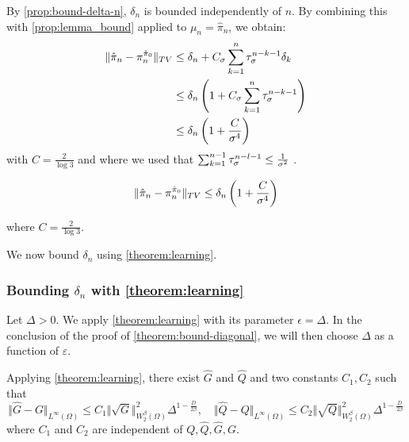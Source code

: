 By \cref{prop:bound-delta-n}, $\delta_n$ is bounded independently of $n$. By combining this with \cref{prop:lemma_bound} applied to $\mu_n = \hat \pi_n$, we obtain:
    \begin{align}
\Vert \hat \pi_n - \pi_n^{\hat \pi_0}\Vert_{TV} &\leq \delta_n + C_\sigma\sum_{k=1}^n \tau_\sigma^{n-k-1}\delta_k\\
&\leq \delta_n\left(1 + C_\sigma\sum_{k=1}^n \tau_\sigma^{n-k-1}\right)\\
&\leq \delta_n\left(1 + \frac{C}{\sigma^4}\right)
\end{align}
with $C= \frac{2}{\log 3}$ and where we used that $\sum_{k=1}^{n-1}\tau_\sigma^{n-l-1} \leq \frac{1}{\sigma^2}$ \citep{oudjane}.

\begin{align}\label{eq:model-error}
\Vert \hat \pi_n - \pi_n^{\hat \pi_0}\Vert_{TV} \leq \delta_n \left(1 + \frac{C}{\sigma^4}\right)
\end{align}

where $C = \frac{2}{\log 3}$.

We now bound $\delta_n$ using \cref{theorem:learning}.
\subsubsection{Bounding $\delta_n$ with \cref{theorem:learning}}

Let $\Delta > 0$. We apply \cref{theorem:learning} with its parameter $\epsilon = \Delta$. In the conclusion of the proof of \cref{theorem:bound-diagonal}, we will then choose $\Delta$ as a function of $\varepsilon$.

Applying \cref{theorem:learning}, there exist $\hat G$ and $\hat Q$ and two constants $C_1, C_2$ such that
$$\Vert \hat G-G\Vert_{L^\infty(\Omega)}\leq C_1 \Vert \sqrt{G}\Vert^2_{W^\beta_2(\Omega)}\Delta^{1-\frac{D}{2\beta}}, \quad \Vert \hat Q - Q \Vert_{L^\infty(\Omega)}\leq C_2\Vert\sqrt{Q}\Vert^2_{W^\beta_2(\Omega)}\Delta^{1-\frac{D}{2\beta}}$$
where $C_1$ and $C_2$ are independent of $Q,\hat Q, \hat G, G$.

